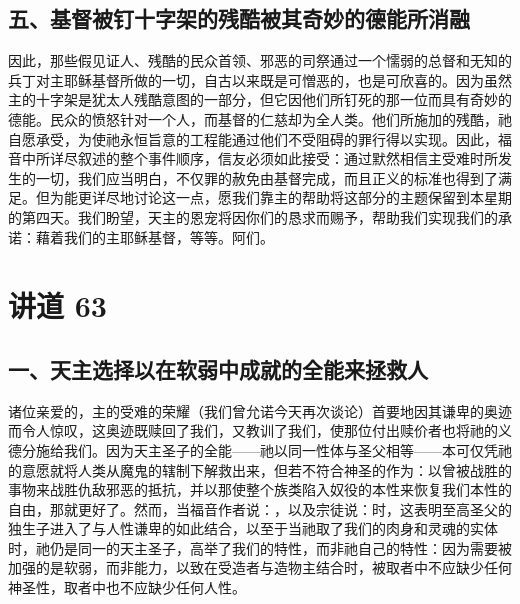
\subsection{五、基督被钉十字架的残酷被其奇妙的德能所消融}

因此，那些假见证人、残酷的民众首领、邪恶的司祭通过一个懦弱的总督和无知的兵丁对主耶稣基督所做的一切，自古以来既是可憎恶的，也是可欣喜的。因为虽然主的十字架是犹太人残酷意图的一部分，但它因他们所钉死的那一位而具有奇妙的德能。民众的愤怒针对一个人，而基督的仁慈却为全人类。他们所施加的残酷，祂自愿承受，为使祂永恒旨意的工程能通过他们不受阻碍的罪行得以实现。因此，福音中所详尽叙述的整个事件顺序，信友必须如此接受：通过默然相信主受难时所发生的一切，我们应当明白，不仅罪的赦免由基督完成，而且正义的标准也得到了满足。但为能更详尽地讨论这一点，愿我们靠主的帮助将这部分的主题保留到本星期的第四天。我们盼望，天主的恩宠将因你们的恳求而赐予，帮助我们实现我们的承诺：藉着我们的主耶稣基督，等等。阿们。\par



\section{讲道 63}

\par


\subsection{一、天主选择以在软弱中成就的全能来拯救人}

诸位亲爱的，主的受难的荣耀（我们曾允诺今天再次谈论）首要地因其谦卑的奥迹而令人惊叹，这奥迹既赎回了我们，又教训了我们，使那位付出赎价者也将祂的义德分施给我们。因为天主圣子的全能——祂以同一性体与圣父相等——本可仅凭祂的意愿就将人类从魔鬼的辖制下解救出来，但若不符合神圣的作为：以曾被战胜的事物来战胜仇敌邪恶的抵抗，并以那使整个族类陷入奴役的本性来恢复我们本性的自由，那就更好了。然而，当福音作者说：，以及宗徒说：时，这表明至高圣父的独生子进入了与人性谦卑的如此结合，以至于当祂取了我们的肉身和灵魂的实体时，祂仍是同一的天主圣子，高举了我们的特性，而非祂自己的特性：因为需要被加强的是软弱，而非能力，以致在受造者与造物主结合时，被取者中不应缺少任何神圣性，取者中也不应缺少任何人性。\par


